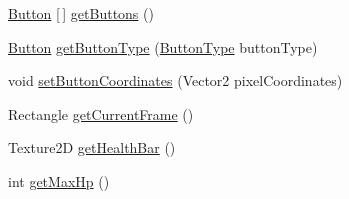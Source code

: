 \begin{DoxyCompactItemize}
\hyperlink{class_model_1_1_button}{Button} \mbox{[}$\,$\mbox{]} \hyperlink{class_model_1_1_unit_module_1_1_warrior_af234ef405cb908c373946d012bac57be}{get\+Buttons} ()
\item 
\hyperlink{class_model_1_1_button}{Button} \hyperlink{class_model_1_1_unit_module_1_1_warrior_ab0bfca3f6dc3b86e966afb7e9ef8cead}{get\+Button\+Type} (\hyperlink{namespace_model_ac76b3489c9d704f49912608bd36cd0e7}{Button\+Type} button\+Type)
\item 
void \hyperlink{class_model_1_1_unit_module_1_1_warrior_ac988bd449f7f88fd8108278107cdba77}{set\+Button\+Coordinates} (Vector2 pixel\+Coordinates)
\item 
Rectangle \hyperlink{class_model_1_1_unit_module_1_1_warrior_ab6a358a386cb1a55b619b8517b084ef7}{get\+Current\+Frame} ()
\item 
Texture2D \hyperlink{class_model_1_1_unit_module_1_1_warrior_a4a2706ae17e29c3c22c30b057786e63f}{get\+Health\+Bar} ()
\item 
int \hyperlink{class_model_1_1_unit_module_1_1_warrior_a1f8dded5d374af5e7e2f68a6977a19c3}{get\+Max\+Hp} ()
\end{DoxyCompactItemize}
